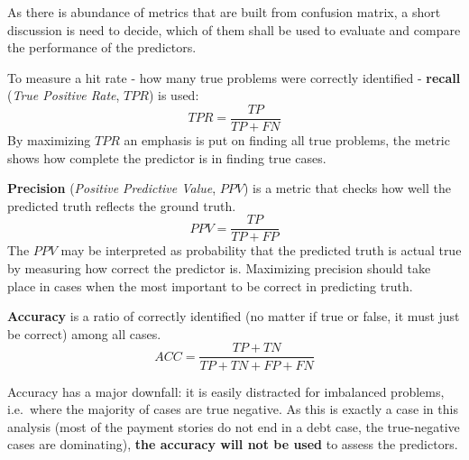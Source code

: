 \documentclass{article}
\begin{document}
As there is abundance of metrics that are built from confusion matrix, a short discussion is need to decide,
which of them shall be used to evaluate and compare the performance of the predictors.
\vspace{0.5cm}
\par To measure a hit rate - how many true problems were correctly identified - \textbf{recall} (\textit{True Positive Rate}, $TPR$) is used:
\[TPR=\frac{TP}{TP+FN}\]
By maximizing $TPR$ an emphasis is put on finding all true problems, the metric shows how complete the predictor is in finding true cases.
\vspace{0.5cm}
\par \textbf{Precision} (\textit{Positive Predictive Value}, $PPV$) is a metric that checks how well the predicted truth reflects the ground truth.
\[PPV=\frac{TP}{TP+FP}\]
The $PPV$ may be interpreted as probability that the predicted truth is actual true by measuring how correct the predictor is.
Maximizing precision should take place in cases when the most important to be correct in predicting truth.
\vspace{0.5cm}
\par \textbf{Accuracy} is a ratio of correctly identified (no matter if true or false, it must just be correct) among all cases.
\[ACC=\frac{TP+TN}{TP+TN+FP+FN}\]
\par Accuracy has a major downfall: it is easily distracted for imbalanced problems, i.e.\ where the majority of cases are true negative.
As this is exactly a case in this analysis (most of the payment stories do not end in a debt case, the true-negative cases are dominating),
\textbf{the accuracy will not be used} to assess the predictors.
\vspace{0.5cm}
\end{document}
